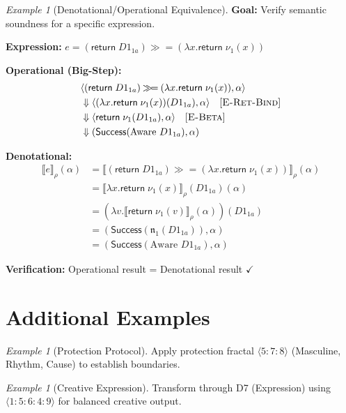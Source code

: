 \documentclass[11pt,twoside,openright]{book}
\theoremstyle{definition}
\theoremstyle{plain}
\theoremstyle{remark}
\newtheorem{example}[definition]{Example}
\newcommand{\sem}[1]{\llbracket #1 \rrbracket}
\newcommand{\noe}[1]{\nu_{#1}}
\newcommand{\rpmret}{\mathsf{return}}
\newcommand{\rpmbind}{\mathbin{\gg\!=}}
\newcommand{\bigstep}{\Downarrow}
\begin{document}
\begin{example}[Denotational/Operational Equivalence]
\label{ex:den-op-equiv}
\textbf{Goal:} Verify semantic soundness for a specific expression.

\textbf{Expression:} $e = (\rpmret\; D1_{1a}) \rpmbind (\lambda x. \rpmret\; \noe{1}(x))$

\textbf{Operational (Big-Step):}
\begin{align}
&\langle (\rpmret\; D1_{1a}) \rpmbind (\lambda x. \rpmret\; \noe{1}(x)), \alpha \rangle \\
&\bigstep \langle (\lambda x. \rpmret\; \noe{1}(x))(D1_{1a}), \alpha \rangle \quad [\textsc{E-Ret-Bind}] \\
&\bigstep \langle \rpmret\; \noe{1}(D1_{1a}), \alpha \rangle \quad [\textsc{E-Beta}] \\
&\bigstep (\mathsf{Success}(\text{Aware } D1_{1a}), \alpha)
\end{align}

\textbf{Denotational:}
\begin{align}
\sem{e}_\rho(\alpha) &= \sem{(\rpmret\; D1_{1a}) \rpmbind (\lambda x. \rpmret\; \noe{1}(x))}_\rho(\alpha) \\
&= \sem{\lambda x. \rpmret\; \noe{1}(x)}_\rho(D1_{1a})(\alpha) \\
&= (\lambda v. \sem{\rpmret\; \noe{1}(v)}_\rho(\alpha))(D1_{1a}) \\
&= (\mathsf{Success}(\mathfrak{n}_1(D1_{1a})), \alpha) \\
&= (\mathsf{Success}(\text{Aware } D1_{1a}), \alpha)
\end{align}

\textbf{Verification:} Operational result = Denotational result $\checkmark$
\end{example}

\section{Additional Examples}

\begin{example}[Protection Protocol]
\label{ex:protection}
Apply protection fractal $\langle 5:7:8 \rangle$ (Masculine, Rhythm, Cause) to establish boundaries.
\end{example}

\begin{example}[Creative Expression]
\label{ex:creative}
Transform through D7 (Expression) using $\langle 1:5:6:4:9 \rangle$ for balanced creative output.
\end{example}
\end{document}
